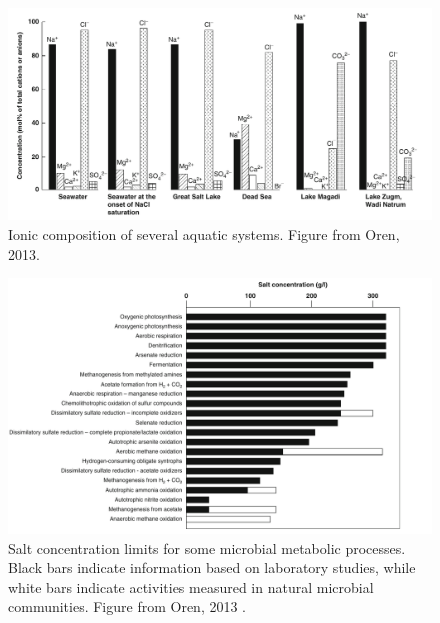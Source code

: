 \begin{figure}[!htbp]
	\centering
	\includegraphics[width=\textwidth]{Chapter1/Figures/IonicComposition.pdf}
	\caption{Ionic composition of several aquatic systems. Figure from Oren, 2013. \cite{Oren:2013bc}}
	\label{IonicComposition}
\end{figure}

\begin{figure}[!htbp]
	\centering
	\includegraphics[width=\textwidth]{Chapter1/Figures/HaloMetabolism.pdf}
	\caption{Salt concentration limits for some microbial metabolic processes. Black bars indicate information based on laboratory studies, while white bars indicate activities measured in natural microbial communities. Figure from Oren, 2013 \cite{Oren:2013bc}.}
	\label{HaloMetabolis}
\end{figure}


